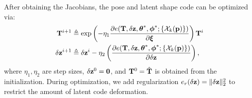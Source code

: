 After obtaining the Jacobians, the pose and latent shape code can be optimized via:
\begin{equation*}
\begin{aligned}
\mathbf{T}^{i+1} &\triangleq 
\exp \left(- \eta_1 
\frac{\partial e(\mathbf{T},\delta \mathbf{z}, \boldsymbol{\theta}^*, \boldsymbol{\phi}^* ; \left\{{\cal X}_k(\mathbf{p})\right\})}{\partial \boldsymbol{\xi}}\right)
\mathbf{T}^{i}
\\
\delta \mathbf{z}^{i+1} &\triangleq 
\delta \mathbf{z}^{i} - \eta_2 
\left(\frac{\partial e(\mathbf{T},\delta \mathbf{z}, \boldsymbol{\theta}^*, \boldsymbol{\phi}^* ; \left\{{\cal X}_k(\mathbf{p})\right\})}{\partial \delta \mathbf{z}}\right), 
\end{aligned}
\end{equation*}
where $\eta_1, \eta_2$ are step sizes, $\delta \mathbf{z}^0 = \mathbf{0}$, and $\mathbf{T}^0 = \hat{\mathbf{T}}$ is obtained from the initialization. During optimization, we add regularization $e_r(\delta\mathbf{z}) = \|\delta\mathbf{z}\|_2^2$ to restrict the amount of latent code deformation.

